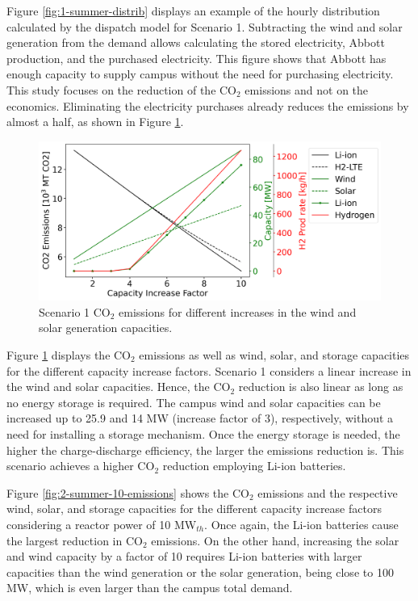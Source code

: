 \documentclass{anstrans}
\begin{document}
Figure \ref{fig:1-summer-distrib} displays an example of the hourly distribution calculated by the dispatch model for Scenario 1.
Subtracting the wind and solar generation from the demand allows calculating the stored electricity, Abbott production, and the purchased electricity.
This figure shows that Abbott has enough capacity to supply campus without the need for purchasing electricity.
This study focuses on the reduction of the CO$_2$ emissions and not on the economics.
Eliminating the electricity purchases already reduces the emissions by almost a half, as shown in Figure \ref{fig:1-summer-emissions}.

\begin{figure}[htbp!] %
    \centering
    \includegraphics[width=0.99\linewidth]{figures/scenario1-summerA}
    \hfill
    \caption{Scenario 1 CO$_2$ emissions for different increases in the wind and solar generation capacities.}
    \label{fig:1-summer-emissions}
\end{figure}

Figure \ref{fig:1-summer-emissions} displays the CO$_2$ emissions as well as wind, solar, and storage capacities for the different capacity increase factors.
Scenario 1 considers a linear increase in the wind and solar capacities.
Hence, the CO$_2$ reduction is also linear as long as no energy storage is required.
The campus wind and solar capacities can be increased up to 25.9 and 14 MW (increase factor of 3), respectively, without a need for installing a storage mechanism.
Once the energy storage is needed, the higher the charge-discharge efficiency, the larger the emissions reduction is.
This scenario achieves a higher CO$_2$ reduction employing Li-ion batteries.

Figure \ref{fig:2-summer-10-emissions} shows the CO$_2$ emissions and the respective wind, solar, and storage capacities for the different capacity increase factors considering a reactor power of 10 MW$_{th}$.
Once again, the Li-ion batteries cause the largest reduction in CO$_2$ emissions.
On the other hand, increasing the solar and wind capacity by a factor of 10 requires Li-ion batteries with larger capacities than the wind generation or the solar generation, being close to 100 MW, which is even larger than the campus total demand.
\end{document}

